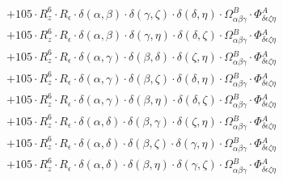 \documentclass{article}
\begin{document}
\begin{equation}
\begin{array}{c}
 \\[0.2em] 		 + 105 \cdot R_{z}^{6} \cdot R_{\epsilon{}} \cdot \delta{}\left(\alpha{}, \beta{}\right) \cdot \delta{}\left(\gamma{}, \zeta{}\right) \cdot \delta{}\left(\delta{}, \eta{}\right) \cdot \Omega{}^{B}_{\alpha{}\beta{}\gamma{}} \cdot \Phi{}^{A}_{\delta{}\epsilon{}\zeta{}\eta{}} 
 \\[0.2em] 		 + 105 \cdot R_{z}^{6} \cdot R_{\epsilon{}} \cdot \delta{}\left(\alpha{}, \beta{}\right) \cdot \delta{}\left(\gamma{}, \eta{}\right) \cdot \delta{}\left(\delta{}, \zeta{}\right) \cdot \Omega{}^{B}_{\alpha{}\beta{}\gamma{}} \cdot \Phi{}^{A}_{\delta{}\epsilon{}\zeta{}\eta{}} 
 \\[0.2em] 		 + 105 \cdot R_{z}^{6} \cdot R_{\epsilon{}} \cdot \delta{}\left(\alpha{}, \gamma{}\right) \cdot \delta{}\left(\beta{}, \delta{}\right) \cdot \delta{}\left(\zeta{}, \eta{}\right) \cdot \Omega{}^{B}_{\alpha{}\beta{}\gamma{}} \cdot \Phi{}^{A}_{\delta{}\epsilon{}\zeta{}\eta{}} 
 \\[0.2em] 		 + 105 \cdot R_{z}^{6} \cdot R_{\epsilon{}} \cdot \delta{}\left(\alpha{}, \gamma{}\right) \cdot \delta{}\left(\beta{}, \zeta{}\right) \cdot \delta{}\left(\delta{}, \eta{}\right) \cdot \Omega{}^{B}_{\alpha{}\beta{}\gamma{}} \cdot \Phi{}^{A}_{\delta{}\epsilon{}\zeta{}\eta{}} 
 \\[0.2em] 		 + 105 \cdot R_{z}^{6} \cdot R_{\epsilon{}} \cdot \delta{}\left(\alpha{}, \gamma{}\right) \cdot \delta{}\left(\beta{}, \eta{}\right) \cdot \delta{}\left(\delta{}, \zeta{}\right) \cdot \Omega{}^{B}_{\alpha{}\beta{}\gamma{}} \cdot \Phi{}^{A}_{\delta{}\epsilon{}\zeta{}\eta{}} 
 \\[0.2em] 		 + 105 \cdot R_{z}^{6} \cdot R_{\epsilon{}} \cdot \delta{}\left(\alpha{}, \delta{}\right) \cdot \delta{}\left(\beta{}, \gamma{}\right) \cdot \delta{}\left(\zeta{}, \eta{}\right) \cdot \Omega{}^{B}_{\alpha{}\beta{}\gamma{}} \cdot \Phi{}^{A}_{\delta{}\epsilon{}\zeta{}\eta{}} 
 \\[0.2em] 		 + 105 \cdot R_{z}^{6} \cdot R_{\epsilon{}} \cdot \delta{}\left(\alpha{}, \delta{}\right) \cdot \delta{}\left(\beta{}, \zeta{}\right) \cdot \delta{}\left(\gamma{}, \eta{}\right) \cdot \Omega{}^{B}_{\alpha{}\beta{}\gamma{}} \cdot \Phi{}^{A}_{\delta{}\epsilon{}\zeta{}\eta{}} 
 \\[0.2em] 		 + 105 \cdot R_{z}^{6} \cdot R_{\epsilon{}} \cdot \delta{}\left(\alpha{}, \delta{}\right) \cdot \delta{}\left(\beta{}, \eta{}\right) \cdot \delta{}\left(\gamma{}, \zeta{}\right) \cdot \Omega{}^{B}_{\alpha{}\beta{}\gamma{}} \cdot \Phi{}^{A}_{\delta{}\epsilon{}\zeta{}\eta{}} 

\end{array}
\end{equation}
\end{document}
